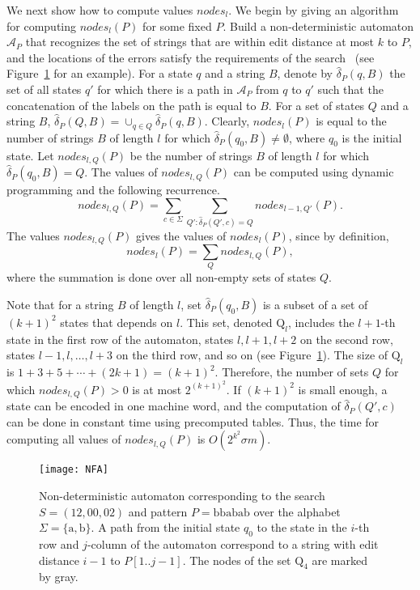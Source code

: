 \documentclass[12pt]{article}
\newcommand{\substr}[3]{#1[#2..#3]}
\newcommand{\numnodes}[1]{\mathit{nodes}_{#1}}
\newcommand{\numnodesp}[2]{\mathit{nodes}_{#1}(#2)}
\newcommand{\numnodesqp}[3]{\mathit{nodes}_{#1,#2}(#3)}
\newcommand{\automaton}[1]{\mathcal{A}_{#1}}
\newcommand{\transition}[1]{\hat{\delta}_{#1}}
\newcommand{\states}[1]{\mathrm{Q}_{#1}}
\begin{document}
We next show how to compute values $\numnodes{l}$.
We begin by giving an algorithm for computing $\numnodesp{l}{P}$ for
some fixed $P$.
Build a non-deterministic automaton $\automaton{P}$ that recognizes the
set of strings that are within edit distance at most $k$ to $P$, and the
locations of the errors satisfy the requirements of the
search~\cite{MihovSchulz,KarkkainenN07}
(see Figure~\ref{fig:NFA} for an example).
For a state $q$ and a string $B$, denote by $\transition{P}(q,B)$ the set of all
states $q'$ for which there is a path in $\automaton{P}$ from $q$ to $q'$
such that the concatenation of the labels on the path is equal to $B$.
For a set of states $Q$ and a string $B$,
$\transition{P}(Q,B)=\cup_{q\in Q} \transition{P}(q,B)$.
Clearly, $\numnodesp{l}{P}$ is equal to the number of strings $B$ of length $l$
for which $\transition{P}(q_0,B)\neq \emptyset$,
where $q_0$ is the initial state.
Let $\numnodesqp{l}{Q}{P}$ be the number of strings $B$ of length $l$ for which
$\transition{P}(q_0,B)=Q$.
The values of $\numnodesqp{l}{Q}{P}$ can be computed using dynamic programming
and the following recurrence.
\[
\numnodesqp{l}{Q}{P} = \sum_{c\in \Sigma}
\sum_{Q': \transition{P}(Q',c)=Q} \numnodesqp{l-1}{Q'}{P}.
\]
The values $\numnodesqp{l}{Q}{P}$ gives the values of
$\numnodesp{l}{P}$, since by definition,
\[
\numnodesp{l}{P} = \sum_{Q} \numnodesqp{l}{Q}{P},
\]
where the summation is done over all non-empty sets of states $Q$.

Note that for a string $B$ of length $l$, set $\transition{P}(q_0,B)$
is a subset of a set of $(k+1)^2$ states that depends on $l$. This set,
denoted $\states{l}$, includes the $l+1$-th state in the first row of the
automaton, states $l,l+1,l+2$ on the second row,
states $l-1,l,\ldots,l+3$ on the third row, and so on (see Figure~\ref{fig:NFA}).
The size of $\states{l}$ is $1+3+5+\cdots+(2k+1) = (k+1)^2$.
Therefore, the number of sets $Q$ for which $\numnodesqp{l}{Q}{P}>0$ is at most
$2^{(k+1)^2}$.
If $(k+1)^2$ is small enough, a state can be encoded in one machine word,
and the computation of $\transition{P}(Q',c)$ can be done in constant time using
precomputed tables.
Thus, the time for computing all values of $\numnodesqp{l}{Q}{P}$ is
$O(2^{k^2}\sigma m)$.

\begin{figure}
\centering
\texttt{[image: NFA]}
\caption{Non-deterministic automaton corresponding
to the search $S=(12,00,02)$ and pattern $P=\mathrm{bbabab}$ over the alphabet
$\Sigma=\{\mathrm{a},\mathrm{b}\}$.
A path from the initial state $q_0$ to the state in the $i$-th row and
$j$-column of the automaton correspond to a string with edit distance
$i-1$ to $\substr{P}{1}{j-1}$.
The nodes of the set $\states{4}$ are marked by gray.\label{fig:NFA}}
\end{figure}
\end{document}
